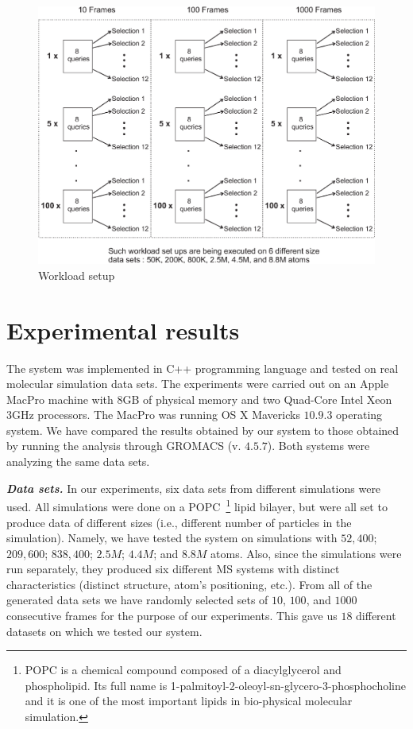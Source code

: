 \documentclass[10pt,journal,final,letterpaper,twocolumn]{IEEEtran}
\begin{document}
\begin{figure}
 \centerline{ \includegraphics[width=.99\columnwidth]{images/workload_set_up1.eps} }
 \caption{Workload setup}
 \label{fg:workload_set_up}
\end{figure}

\section{Experimental results}\label{sc:experiments}

The system was implemented in C++ programming language and tested on
real molecular simulation data sets. The experiments were carried
out on an Apple MacPro machine with 8GB of physical memory and two
Quad-Core Intel Xeon 3GHz processors. The MacPro was running OS X
Mavericks $10.9.3$ operating system. We have compared the results
obtained by our system to those obtained by running the analysis
through GROMACS (v. $4.5.7$). Both systems were analyzing the same
data sets.

\emph{\textbf{Data sets.}} In our experiments, six data sets from
different simulations were used. All simulations were done on a
POPC~\footnote{POPC is a chemical compound composed of a
diacylglycerol and phospholipid. Its full name is
1-palmitoyl-2-oleoyl-sn-glycero-3-phosphocholine and it is one of
the most important lipids in bio-physical molecular simulation.}
lipid bilayer, but were all set to produce data of different sizes
(i.e., different number of particles in the simulation). Namely, we
have tested the system on simulations with $52,400$; $209,600$;
$838,400$; $2.5M$; $4.4M$; and $8.8M$ atoms. Also, since the
simulations were run separately, they produced six different MS
systems with distinct characteristics (distinct structure, atom's
positioning, etc.). From all of the generated data sets we have
randomly selected sets of $10$, $100$, and $1000$ consecutive frames
for the purpose of our experiments. This gave us $18$ different
datasets on which we tested our system.
\end{document}
